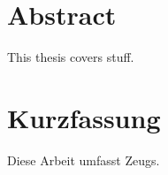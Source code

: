 \chapter*{Abstract}
This thesis covers stuff.
\begingroup
\renewcommand{\cleardoublepage}{}
\renewcommand{\clearpage}{}
\chapter*{Kurzfassung}
\endgroup
Diese Arbeit umfasst Zeugs.
